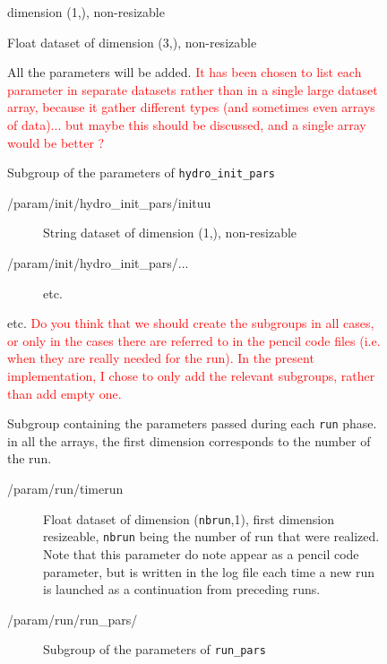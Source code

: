 \documentclass[a4paper,12pt]{article}
\newcommand{\note}[1]{\textcolor{red}{#1}}
\begin{document}
\begin{figure}[p]
{\begin{description}
\begin{description}
\begin{description}
\begin{description}
\begin{description}
            dimension (1,), non-resizable
          \item[/param/init/init\_pars/xyz0] Float dataset of
            dimension (3,), non-resizable
          \item[/param/init/init\_pars/...] All the parameters will be
            added. \note{It has been chosen to list each parameter in
            separate datasets rather than in a single large dataset
            array, because it gather different types (and sometimes
            even arrays of data)... but maybe this should be discussed,
            and a single array would be better ?}
        \end{description}
      \item[/param/init/hydro\_init\_pars/] Subgroup of the parameters
        of \texttt{hydro\_init\_pars}
        \begin{description}
        \item[/param/init/hydro\_init\_pars/inituu] String dataset of
            dimension (1,), non-resizable
        \item[/param/init/hydro\_init\_pars/...] etc.
        \end{description}
      \item[/param/init/...\_init\_pars/] etc. \note{Do you think that we
        should create the subgroups in all cases, or only in the cases
        there are referred to in the pencil code files (i.e. when they
        are really needed for the run). In the present implementation,
        I chose to only add the relevant subgroups, rather than add
        empty one.}
      \end{description}
    \item[/param/run/] Subgroup containing the parameters
      passed during each \texttt{run} phase. in all the arrays, the
      first dimension corresponds to the number of the run.
      \begin{description}
      \item[/param/run/timerun] Float dataset of
        dimension (\texttt{nbrun},1), first dimension resizeable, \texttt{nbrun} being
        the number of run that were realized. Note that this
        parameter do note appear as a pencil code parameter, but is
        written in the log file each time a new run is launched as a
        continuation from preceding runs.
      \item[/param/run/run\_pars/] Subgroup of the parameters of
        \texttt{run\_pars} 
        \begin{description}

\end{description}
\end{description}
\end{description}
\end{description}
\end{description}}
\end{figure}
\end{document}
